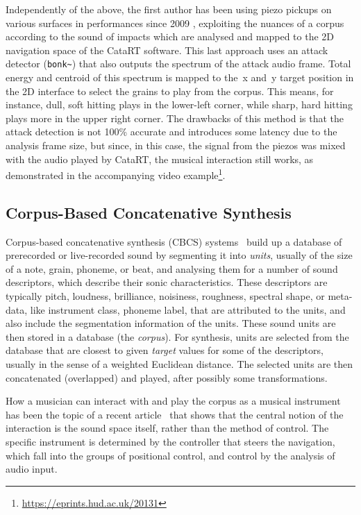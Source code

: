 Independently of the above, the first author has been using piezo pickups on various surfaces in performances since 2009 \cite{Schwarz-nime2012-sound-space}, exploiting the nuances of a corpus according to the sound of impacts which are analysed and mapped to
the 2D navigation space of the CataRT software.
%
This last approach uses an attack detector (\verb|bonk~|) that also outputs the spectrum of the
attack audio frame.  Total energy and centroid of this spectrum is mapped to
the~x and~y target position in the 2D interface to select the grains to play from the corpus.
This means, for instance, dull, soft hitting plays in the lower-left corner, while sharp, hard hitting plays more in the upper right corner.
%
The drawbacks of this method is that the attack detection is not 100\% accurate and introduces some latency due to the analysis frame size, but since, in this case, the signal from the piezos was mixed with the
audio played by CataRT, the musical interaction still works, as demonstrated in the accompanying video example\footnote{\url{https://eprints.hud.ac.uk/20131}\label{videourl}}. %

\subsection{Corpus-Based Concatenative Synthesis}

Corpus-based concatenative synthesis (CBCS) systems~\cite{Schwarz-ieeespm2007-concat} build up a database of prerecorded or live-recorded sound by segmenting it into
\textit{units}, usually of the size of a note, grain, phoneme, or beat, and analysing them for a
number of sound descriptors, which describe their sonic characteristics.
These descriptors are typically pitch, loudness, brilliance, noisiness, roughness, spectral shape, or meta-data, like instrument class, phoneme label, that are attributed to the units,
and also include the segmentation information of the units.
These sound units are then stored in a database (the \textit{corpus}).  For synthesis, units are
selected from the database that are closest to given \textit{target} values for some of the
descriptors, usually in the sense of a weighted Euclidean distance.
The selected units are then concatenated (overlapped) and played, after possibly some transformations.

How a musician can interact with and play the corpus as a musical instrument has been the topic of a recent article~\cite{Schwarz-nime2012-sound-space} that shows that the central notion of the interaction is the sound space itself, rather than the method of control.
%
%
The specific instrument is determined by the controller that steers the
navigation, which fall into the groups of positional control, and control by the analysis of audio
input.

